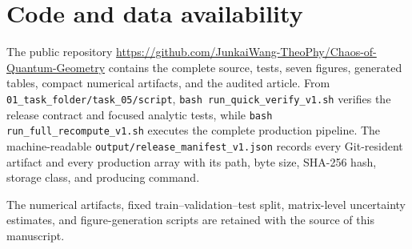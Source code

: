 \documentclass[aps,prb,reprint,superscriptaddress,longbibliography,floatfix]{revtex4-2}
\begin{document}
\appendix



\section*{Code and data availability}
The public repository \url{https://github.com/JunkaiWang-TheoPhy/Chaos-of-Quantum-Geometry} contains the complete source, tests, seven figures, generated tables, compact numerical artifacts, and the audited article. From \texttt{01\_task\_folder/task\_05/script}, \texttt{bash run\_quick\_verify\_v1.sh} verifies the release contract and focused analytic tests, while \texttt{bash run\_full\_recompute\_v1.sh} executes the complete production pipeline. The machine-readable \texttt{output/release\_manifest\_v1.json} records every Git-resident artifact and every production array with its path, byte size, SHA-256 hash, storage class, and producing command.

\begin{acknowledgments}
The numerical artifacts, fixed train--validation--test split, matrix-level uncertainty estimates, and figure-generation scripts are retained with the source of this manuscript.
\end{acknowledgments}


\end{document}
